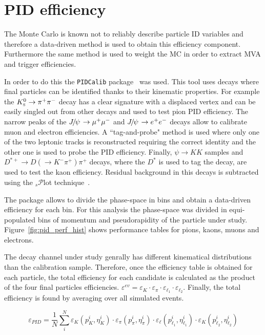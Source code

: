 \section{PID efficiency}
\label{sec:RKst_pid_eff}

The Monte Carlo is known not to reliably describe particle ID variables
and therefore a data-driven method is used to obtain this efficiency component.
Furthermore the same method is used to weight the MC in order to extract MVA and trigger efficiencies.

In order to do this the \verb!PIDCalib! package~\cite{Aaij:1978280} was used. This tool uses
decays where final  particles can be identified thanks to their kinematic properties.
For example the $\KS\to\pi^+\pi^-$ decay has a clear signature with a displaced vertex
and can be easily singled out from other decays and used to test pion PID efficiency.
The narrow peaks of the $\jpsi\to\mumu$ and $\jpsi\to\ee$ decays allow to calibrate
muon and electron efficiencies. A ``tag-and-probe" method is used where only one 
of the two leptonic tracks is reconstructed requiring the correct identity and the other one
is used to probe the PID efficiency. Finally,  $\psi\to KK$ samples and 
$D^{*+}\to D(\to K^-\pi^+)\pi^+$ decays, where the $D^{*}$ is used to tag the decay,
are used to test the kaon efficiency. Residual background in this decays is subtracted using
the $_s\mathcal{P}$lot technique~\cite{sPlot}.

The package allows to divide the phase-space in bins and obtain a data-driven efficiency for each bin.
For this analysis the phase-space was divided in equi-populated bins of momentum
and pseudorapidity of the particle under study. Figure~\ref{fig:pid_perf_hist} shows performance
tables for pions, kaons, muons and electrons.

The decay channel under study genrally has different kinematical distributions than the calibration sample.
Therefore, once the efficiency table is obtained for each particle, the total efficiency for each candidate
is calculated as the product of the four final particles efficiencies.
$\varepsilon^{ev} = \varepsilon_K\cdot\varepsilon_\pi\cdot\varepsilon_{\ell_1}\cdot\varepsilon_{\ell_2}$.
Finally, the total efficiency is found by averaging over all simulated events.

\begin{equation}
\varepsilon_{PID} = \frac{1}{N} \sum_i^N \varepsilon_K(p_K^i,\eta_K^i) \cdot \varepsilon_\pi(p_\pi^i,\eta_\pi^i) \cdot \varepsilon_\ell(p_{\ell_1}^i,\eta_{\ell_1}^i) \cdot \varepsilon_K(p_{\ell_2}^i,\eta_{\ell_2}^i)
\end{equation}

